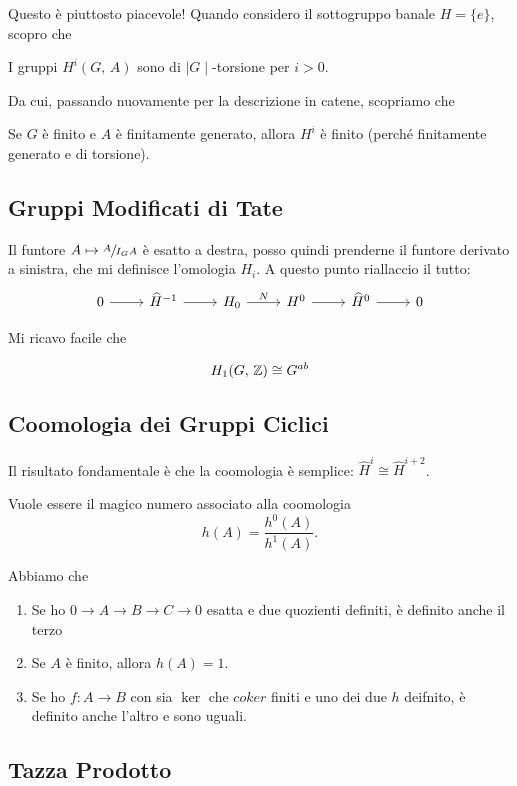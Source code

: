 \documentclass[a4paper]{article}
\begin{document}
	Questo è piuttosto piacevole! Quando considero il sottogruppo banale $ H = \{ e \} $, scopro che
	
	\begin{theorem}
		I gruppi $ H^i(G, \, A) $ sono di $ \mid G \mid  $-torsione per $ i > 0. $
	\end{theorem}

	Da cui, passando nuovamente per la descrizione in catene, scopriamo che
	\begin{theorem}
		Se $ G $ è finito e $ A $ è finitamente generato, allora $ H^i $ è finito (perché finitamente generato e di torsione).
	\end{theorem}

	\subsection{Gruppi Modificati di Tate}
	Il funtore $ A \mapsto \sfrac{A}{I_GA} $  è esatto a destra, posso quindi prenderne il funtore derivato a sinistra, che mi definisce l'omologia $ H_i. $ A questo punto riallaccio il tutto:
	\[ \begin{tikzcd}
	0 \rar &  \widehat{H}^{-1} \rar & H_0 \rar["N"] & H^0 \rar & \widehat{H}^0 \rar & 0
	\end{tikzcd} \]
	
	Mi ricavo facile che
	\begin{theorem}
		\[ H_1(G, \, \mathbb{Z}) \cong G^{ab} \]
	\end{theorem}

	\subsection{Coomologia dei Gruppi Ciclici}
	Il risultato fondamentale è che la coomologia è semplice: $ \widehat{H}^i \cong \widehat{H}^{i+2} $.
	
	\begin{definition}
		Vuole essere il magico numero associato alla coomologia
		\[ h(A) = \frac{h^0(A)}{h^1(A)}. \]
	\end{definition}	

	\begin{theorem}
		Abbiamo che
		\begin{enumerate}
			\item Se ho $ 0 \to A \to B \to C \to 0 $ esatta e due quozienti definiti, è definito anche il terzo
			\item Se $ A $ è finito, allora $ h(A) = 1 $.
			\item Se ho $ f \colon A \to B $ con sia $ \ker $ che $ coker$ finiti e uno dei due $ h $ deifnito, è definito anche l'altro e sono uguali.
		\end{enumerate}
	\end{theorem}

	\subsection{Tazza Prodotto}
	
\end{document}
